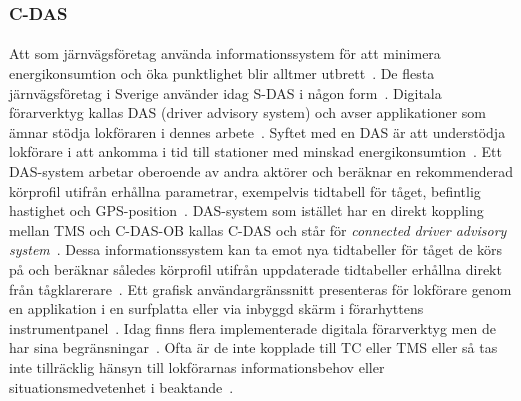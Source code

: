\subsubsection{C-DAS}\label{subsubsec:c-das-litteraturstudie}
\paragraph{}
\hspace{-11pt}
Att som järnvägsföretag använda informationssystem för att minimera energikonsumtion och öka punktlighet blir alltmer utbrett~\cite{Bae2014, Kamenicky2016, Konstantinos2013, Cwil2018, Tschirner2013, Yang2013, Joborn2023}.
De flesta järnvägsföretag i Sverige använder idag S-DAS i någon form~\cite{Systemdefinition2019}.
Digitala förarverktyg kallas DAS (driver advisory system) och avser applikationer som ämnar stödja lokföraren i dennes arbete~\cite{Yang2013, Lindmark2022, Tschirner2013}.
Syftet med en DAS är att understödja lokförare i att ankomma i tid till stationer med minskad energikonsumtion~\cite{IRS90940}.
Ett DAS-system arbetar oberoende av andra aktörer och beräknar en rekommenderad körprofil utifrån erhållna parametrar, exempelvis tidtabell för tåget, befintlig hastighet och GPS-position~\cite{IRS90940}.
DAS-system som istället har en direkt koppling mellan TMS och C-DAS-OB kallas C-DAS och står för \emph{connected driver advisory system}~\cite{Bae2014, Kamenicky2016, Konstantinos2013, Cwil2018, Tschirner2013, Yang2013, Joborn2023}.
Dessa informationssystem kan ta emot nya tidtabeller för tåget de körs på och beräknar således körprofil utifrån uppdaterade tidtabeller erhållna direkt från tågklarerare~\cite{Bae2014, Kamenicky2016, Konstantinos2013, Cwil2018, Tschirner2013, Yang2013, Joborn2023}.
Ett grafisk användargränssnitt presenteras för lokförare genom en applikation i en surfplatta eller via inbyggd skärm i förarhyttens instrumentpanel~\cite{Bae2014, Kamenicky2016, Konstantinos2013, Cwil2018, Tschirner2013, Yang2013, Joborn2023, Lindmark2022, Angel2020}.
Idag finns flera implementerade digitala förarverktyg men de har sina begränsningar~\cite{Bae2014}.
Ofta är de inte kopplade till TC eller TMS eller så tas inte tillräcklig hänsyn till lokförarnas informationsbehov eller situationsmedvetenhet i beaktande~\cite{Bae2014, Joborn2023, Tschirner2013}.
